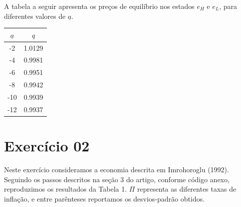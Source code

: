 \documentclass{article}
\begin{document}
A tabela a seguir apresenta os preços de equilíbrio nos estados $e_H$ e $e_L$, para diferentes valores de $\underline{a}$. \\



\begin{center}

\begin{tabular}{cc}

	\hline $\underline{a}$ & $q$ \\ \hline

	-2  &  1.0129 \\

	-4  &  0.9981 \\

	-6  &  0.9951 \\

	-8  &  0.9942 \\

         -10  & 0.9939 \\

         -12  &  0.9937 \\ \hline

\end{tabular}

\end{center}

\newpage
\section*{Exercício 02}

Neste exercício consideramos a economia descrita em Imrohoroglu (1992). Seguindo os passos descritos na seção 3 do artigo, conforme código anexo, reproduzimos os resultados da Tabela 1. $\Pi$ representa as diferentes taxas de inflação, e entre parênteses reportamos os desvios-padrão obtidos. 
\end{document}
